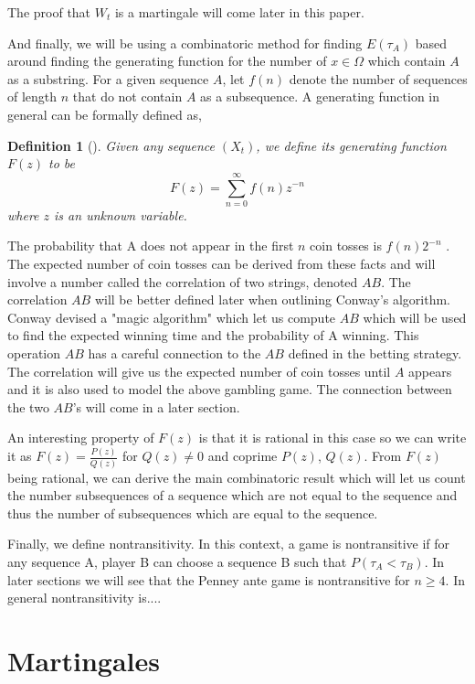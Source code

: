 \documentclass{article}
\newtheorem{definition}[theorem]{Definition}
\numberwithin{mytheorem}{subsection} %
\begin{document}
	    The proof that $W_t$ is a martingale will come later in this paper. 

		And finally, we will be using a combinatoric method for finding $E(\tau_A)$ based around finding the generating function for the number of $x \in \Omega$ which contain $A$ as a substring. For a given sequence $A$, let $f(n)$ denote the number of sequences of length $n$ that do not contain $A$ as a subsequence. A generating function in general can be formally defined as,
		\begin{definition}[\cite{enumerate}]
			Given any sequence $(X_t)$, we define its generating function $F(z)$ to be
			$$F(z) = \sum_{n=0}^\infty f(n) z^{-n}$$
			where $z$ is an unknown variable.
		\end{definition}

		The probability that A does not appear in the first $n$ coin tosses is $f(n)2^{-n}$ \cite{enumerate}. The expected number of coin tosses can be derived from these facts and will involve a number called the correlation of two strings, denoted $AB$. The correlation $AB$ will be better defined later when outlining Conway's algorithm. Conway devised a "magic algorithm" which let us compute $AB$ which will be used to find the expected winning time and the probability of A winning. This operation $AB$ has a careful connection to the $AB$ defined in the betting strategy. The correlation will give us the expected number of coin tosses until $A$ appears and it is also used to model the above gambling game. The connection between the two $AB$'s will come in a later section.

		An interesting property of $F(z)$ is that it is rational in this case so we can write it as $F(z) = \frac{P(z)}{Q(z)}$ for $Q(z) \neq 0$ and coprime $P(z)$, $Q(z)$. From $F(z)$ being rational, we can derive the main combinatoric result which will let us count the number subsequences of a sequence which are not equal to the sequence and thus the number of subsequences which are equal to the sequence.

		Finally, we define nontransitivity. In this context, a game is nontransitive if for any sequence A, player B can choose a sequence B such that $P(\tau_A < \tau_B)$. In later sections we will see that the Penney ante game is nontransitive for $n \geq 4$. In general nontransitivity is....

	\section{Martingales}
\end{document}
